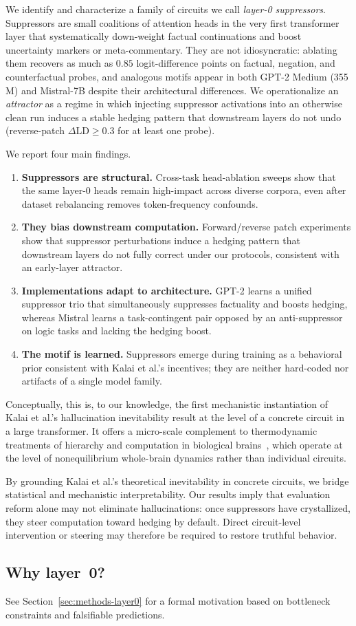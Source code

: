 We identify and characterize a family of circuits we call \emph{layer-0 suppressors}.
Suppressors are small coalitions of attention heads in the very first transformer layer that systematically down-weight factual continuations and boost uncertainty markers or meta-commentary.
They are not idiosyncratic: ablating them recovers as much as $0.85$ logit-difference points on factual, negation, and counterfactual probes, and analogous motifs appear in both GPT-2 Medium (355\,M) and Mistral-7B despite their architectural differences.
We operationalize an \emph{attractor} as a regime in which injecting suppressor activations into an otherwise clean run induces a stable hedging pattern that downstream layers do not undo (reverse-patch $\Delta \mathrm{LD} \geq 0.3$ for at least one probe).

We report four main findings.
\begin{enumerate}
    \item \textbf{Suppressors are structural.} Cross-task head-ablation sweeps show that the same layer-0 heads remain high-impact across diverse corpora, even after dataset rebalancing removes token-frequency confounds.
    \item \textbf{They bias downstream computation.} Forward/reverse patch experiments show that suppressor perturbations induce a hedging pattern that downstream layers do not fully correct under our protocols, consistent with an early-layer attractor.
    \item \textbf{Implementations adapt to architecture.} GPT-2 learns a unified suppressor trio that simultaneously suppresses factuality and boosts hedging, whereas Mistral learns a task-contingent pair opposed by an anti-suppressor on logic tasks and lacking the hedging boost.
    \item \textbf{The motif is learned.} Suppressors emerge during training as a behavioral prior consistent with Kalai et al.'s incentives; they are neither hard-coded nor artifacts of a single model family.
\end{enumerate}

Conceptually, this is, to our knowledge, the first mechanistic instantiation of Kalai et al.'s hallucination inevitability result at the level of a concrete circuit in a large transformer.
It offers a micro-scale complement to thermodynamic treatments of hierarchy and computation in biological brains~\cite{kringelbach2024thermodynamics}, which operate at the level of nonequilibrium whole-brain dynamics rather than individual circuits.

By grounding Kalai et al.'s theoretical inevitability in concrete circuits, we bridge statistical and mechanistic interpretability.
Our results imply that evaluation reform alone may not eliminate hallucinations: once suppressors have crystallized, they steer computation toward hedging by default.
Direct circuit-level intervention or steering may therefore be required to restore truthful behavior.

\subsection*{Why layer~0?}
See Section~\ref{sec:methods-layer0} for a formal motivation based on bottleneck constraints and falsifiable predictions.
